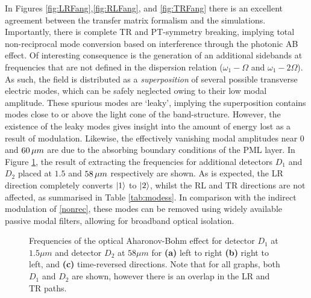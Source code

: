 In Figures \ref{fig:LRFang},\ref{fig:RLFang}, and \ref{fig:TRFang} there is an excellent agreement between the transfer matrix formalism and the simulations. Importantly, there is complete TR and PT-symmetry breaking, implying total non-reciprocal mode conversion based on interference through the photonic AB effect. Of interesting consequence is the generation of an additional sidebands at frequencies that are not defined in the dispersion relation ($\omega_1-\Omega$ and $\omega_1 - 2\Omega$). As such, the field is distributed as a \textit{superposition} of several possible transverse electric modes, which can be safely neglected owing to their low modal amplitude. These spurious modes are `leaky', implying the superposition contains modes close to or above the light cone of the band-structure. However, the existence of the leaky modes gives insight into the amount of energy lost as a result of modulation. Likewise, the effectively vanishing modal amplitudes near $0$ and $60\mskip3mu \mu m$ are due to the absorbing boundary conditions of the PML layer.  In Figure \ref{fig:final}, the result of extracting the frequencies for additional detectors $D_1$ and $D_2$ placed at $1.5$ and $58 \mskip3mu \mu m$ respectively are shown. As is expected, the LR direction completely converts $\ket{1}$ to $\ket{2}$, whilst the RL and TR directions are not affected, as summarised in Table \ref{tab:modess}. In comparison with the indirect modulation of \ref{nonrec}, these modes can be removed using widely available passive modal filters, allowing for broadband optical isolation.



\begin{figure}
	\setlength{\figH}{0.22\textwidth}
	\setlength{\figW}{0.24\textwidth}
	\begin{subfigure}{0.33\textwidth}
		\centering
		
	\end{subfigure}%
	\begin{subfigure}{0.33\textwidth}
		\centering
		
	\end{subfigure}%
	\begin{subfigure}{0.33\textwidth}
		\centering
		
	\end{subfigure}
	\caption[Fourier components of the optical AB effect]{Frequencies of the optical Aharonov-Bohm effect for detector $D_1$ at $1.5 \mu m$ and detector $D_2$ at $58 \mu m$ for \textbf{(a)} left to right \textbf{(b)} right to left, and \textbf{(c)} time-reversed directions. Note that for all graphs, both $D_1$ and $D_2$ are shown, however there is an overlap in the LR and TR paths.}
	\label{fig:final}
\end{figure}



